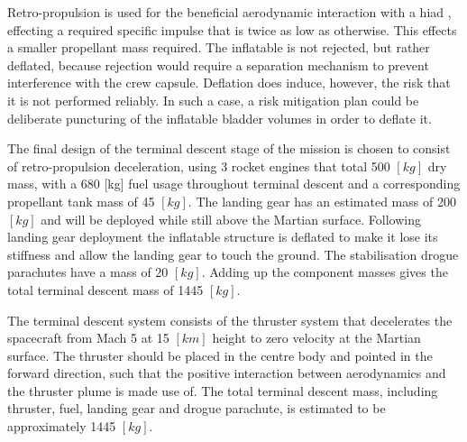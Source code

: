 Retro-propulsion is used for the beneficial aerodynamic interaction with a \gls{hiad} \cite{Korzun2009}, effecting a required specific impulse that is twice as low as otherwise. This effects a smaller propellant mass required. The inflatable is not rejected, but rather deflated, because rejection would require a separation mechanism to prevent interference with the crew capsule. Deflation does induce, however, the risk that it is not performed reliably. In such a case, a risk mitigation plan could be deliberate puncturing of the inflatable bladder volumes in order to deflate it.

The final design of the terminal descent stage of the mission is chosen to consist of retro-propulsion deceleration, using 3 rocket engines that total 500 $[kg]$ dry mass, with a 680 [kg] fuel usage throughout terminal descent and a corresponding propellant tank mass of 45 $[kg]$. The landing gear has an estimated mass of 200 $[kg]$ and will be deployed while still above the Martian surface. Following landing gear deployment the inflatable structure is deflated to make it lose its stiffness and allow the landing gear to touch the ground. The stabilisation drogue parachutes have a mass of 20 $[kg]$. Adding up the component masses gives the total terminal descent mass of 1445 $[kg]$.

The terminal descent system consists of the thruster system that decelerates the spacecraft from Mach 5 at 15 $\left[km\right]$ height to zero velocity at the Martian surface. The thruster should be placed in the centre body and pointed in the forward direction, such that the positive interaction between aerodynamics and the thruster plume is made use of. The total terminal descent mass, including thruster, fuel, landing gear and drogue parachute, is estimated to be approximately 1445 $\left[kg\right]$.